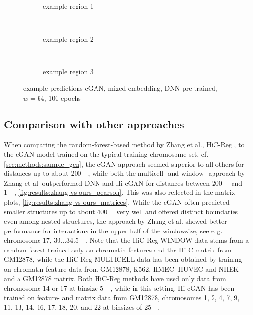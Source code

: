 \begin{figure}[p] %
    \begin{subfigure}{\textwidth}
        \centering
        \caption{example  region 1} \label{fig:results:cGAN64_pretrained_mixed_r1}
    \end{subfigure}\\[3mm]
    \begin{subfigure}{\textwidth}
        \centering
        \caption{example region 2} \label{fig:results:cGAN64_pretrained_mixed_r2}
    \end{subfigure}\\[3mm]
    \begin{subfigure}{\textwidth}
        \centering
        \caption{example region 3} \label{fig:results:cGAN64_pretrained_mixed_r3}
    \end{subfigure}
    \caption{example predictions cGAN, mixed embedding, DNN pre-trained, $w=64$, 100 epochs} 
     \label{fig:results:GAN64_pretrained_mixed_matrices}
\end{figure}

\clearpage
\subsection{Comparison with other approaches}\label{sec:results:comparison}
When comparing the random-forest-based method by Zhang et al., HiC-Reg \cite{Zhang2019}, to the cGAN model trained on the typical training chromosome set, cf. \ref{sec:methods:sample_gen},
the cGAN approach seemed superior to all others for distances up to about \SI{200}{\kilo\bp}, 
while both the multicell- and window- approach by Zhang et al. outperformed DNN and Hi-cGAN for distances between 
\SI{200}{\kilo\bp} and \SI{1}{\mega\bp}, \cref{fig:results:zhang-vs-ours_pearson}.
This was also reflected in the matrix plots, \cref{fig:results:zhang-vs-ours_matrices}. 
While the cGAN often predicted smaller structures up to about \SI{400}{\kilo\bp} very well and offered distinct boundaries
even among nested structures, the approach by Zhang et al. showed better performance for interactions in the upper half of the windowsize,
see e.\,g. chromosome 17, 30...\SI{34.5}{\mega\bp}.
Note that the HiC-Reg WINDOW data stems from a random forest trained only on chromatin features and the Hi-C matrix from GM12878,
while the HiC-Reg MULTICELL data has been obtained by training on chromatin feature data from GM12878, K562, HMEC, HUVEC and NHEK and a GM12878 matrix.
Both HiC-Reg methods have used only data from chromosome 14 or 17 at binsize \SI{5}{\kilo\bp},
while in this setting, Hi-cGAN has been trained on feature- and matrix data from GM12878, chromosomes 1, 2, 4, 7, 9, 11, 13, 14, 16, 17, 18, 20, and 22 at binsizes of \SI{25}{\kilo\bp}.

